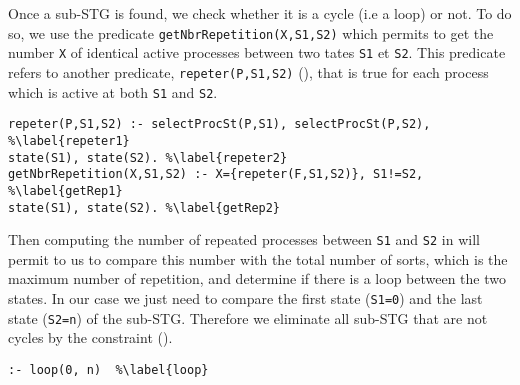 Once a sub-STG is found, we check whether it is a cycle (i.e a loop) or not. 
To do so, we use the predicate \texttt{getNbrRepetition(X,S1,S2)} which permits to get the number \texttt{X} of identical active processes between two tates \texttt{S1} et \texttt{S2}. This predicate refers to another predicate, \texttt{repeter(P,S1,S2)} (), that is true for each process which is active at both \texttt{S1} and \texttt{S2}. 
\begin{lstlisting}
repeter(P,S1,S2) :- selectProcSt(P,S1), selectProcSt(P,S2), %\label{repeter1}
state(S1), state(S2). %\label{repeter2}
getNbrRepetition(X,S1,S2) :- X={repeter(F,S1,S2)}, S1!=S2, %\label{getRep1}
state(S1), state(S2). %\label{getRep2}
\end{lstlisting}
Then computing the number of repeated processes between \texttt{S1} and \texttt{S2} in  will permit to us to compare this number with the total number of sorts, which is the maximum number of repetition, and determine if there is a loop between the two states. In our case we just need to compare the first state (\texttt{S1=0}) and the last state (\texttt{S2=n}) of the sub-STG. Therefore we eliminate all sub-STG that are not cycles by the constraint ().
\begin{lstlisting}
:- loop(0, n)  %\label{loop}
\end{lstlisting}

